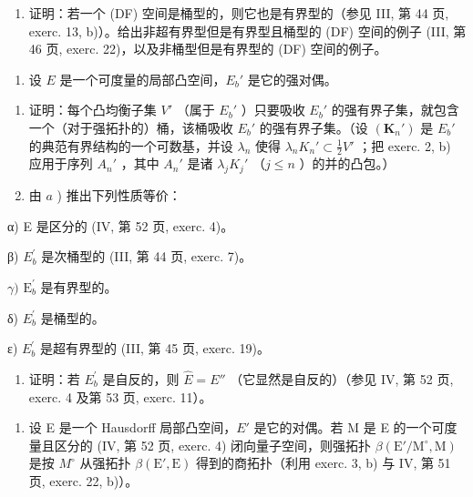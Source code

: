 \begin{enumerate}
\def\labelenumi{\alph{enumi})}
\setcounter{enumi}{2}
\tightlist
\item
  证明：若一个 (DF) 空间是桶型的，则它也是有界型的（参见 III, 第 44 页, exerc. 13, b)）。给出非超有界型但是有界型且桶型的 (DF) 空间的例子 (III, 第 46 页, exerc. 22)，以及非桶型但是有界型的 (DF) 空间的例子。
\end{enumerate}

\begin{enumerate}
\def\labelenumi{\arabic{enumi})}
\setcounter{enumi}{2}
\tightlist
\item
  设 \(E\) 是一个可度量的局部凸空间，\(E_b'\) 是它的强对偶。
\end{enumerate}

\begin{enumerate}
\def\labelenumi{\alph{enumi})}
\item
  证明：每个凸均衡子集 \(V'\) （属于 \(E_{b}'\) ）只要吸收 \(E_{b}'\) 的强有界子集，就包含一个（对于强拓扑的）桶，该桶吸收 \(E_{b}'\) 的强有界子集。（设 \((\mathbf{K}_{n}')\) 是 \(E_{b}'\) 的典范有界结构的一个可数基，并设 \(\lambda_{n}\) 使得 \(\lambda_{n}K_{n}' \subset \frac{1}{2}V'\) ；把 exerc. 2, b) 应用于序列 \(A_{n}'\) ，其中 \(A_{n}'\) 是诸 \(\lambda_{j}K_{j}'\) （\(j \leqslant n\) ）的并的凸包。）
\item
  由 \(a\) ) 推出下列性质等价：
\end{enumerate}

α) E 是区分的 (IV, 第 52 页, exerc. 4)。

β) \(E_{b}^{\prime}\) 是次桶型的 (III, 第 44 页, exerc. 7)。

\(\gamma)\) \(\mathrm{E}_b^{\prime}\) 是有界型的。

δ) \(E_{b}^{\prime}\) 是桶型的。

ε) \(E_{b}^{\prime}\) 是超有界型的 (III, 第 45 页, exerc. 19)。

\begin{enumerate}
\def\labelenumi{\alph{enumi})}
\setcounter{enumi}{2}
\tightlist
\item
  证明：若 \(E_{b}^{\prime}\) 是自反的，则 \(\hat{E} = E''\) （它显然是自反的）（参见 IV, 第 52 页, exerc. 4 及第 53 页, exerc. 11）。
\end{enumerate}

\begin{enumerate}
\def\labelenumi{\arabic{enumi})}
\setcounter{enumi}{3}
\tightlist
\item
  设 E 是一个 Hausdorff 局部凸空间，\(E'\) 是它的对偶。若 M 是 E 的一个可度量且区分的 (IV, 第 52 页, exerc. 4) 闭向量子空间，则强拓扑 \(\beta(\mathrm{E}'/\mathrm{M}^{\circ}, \mathrm{M})\) 是按 \(M^{\circ}\) 从强拓扑 \(\beta(\mathrm{E}', \mathrm{E})\) 得到的商拓扑（利用 exerc. 3, b) 与 IV, 第 51 页, exerc. 22, b)）。
\end{enumerate}

